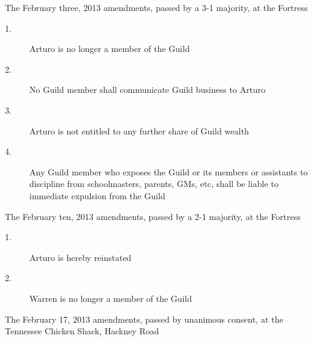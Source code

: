 \tb

The February three, 2013 amendments, passed by a 3-1 majority, at the 
Fortress

\begin{description}
\item[1.] Arturo is no longer a member of the Guild

\item[2.] No Guild member shall communicate Guild business to Arturo

\item[3.] Arturo is not entitled to any further share of Guild wealth

\item[4.] Any Guild member who exposes the Guild or its members or assistants 
to discipline from schoolmasters, parents, GMs, etc, shall be liable to 
immediate expulsion from the Guild
\end{description}

\tb

The February ten, 2013 amendments, passed by a 2-1 majority, at the 
Fortress

\begin{description}
\item[1.] Arturo is hereby reinstated

\item[2.] Warren is no longer a member of the Guild
\end{description}

\tb

The February 17, 2013 amendments, passed by unanimous consent, at the 
Tennessee Chicken Shack, Hackney Road

